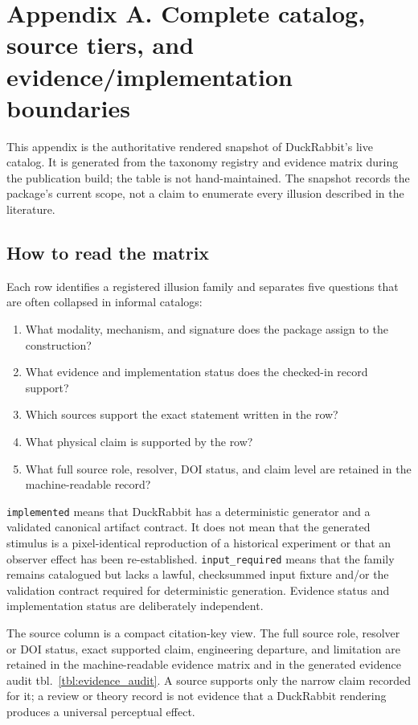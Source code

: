 \documentclass[
  english,
]{article}
\providecommand{\tightlist}{%
  \setlength{\itemsep}{0pt}\setlength{\parskip}{0pt}}
\begin{document}
\newpage

\section{Appendix A. Complete catalog, source tiers, and
evidence/implementation boundaries}\label{sec:appendix_catalog}

This appendix is the authoritative rendered snapshot of DuckRabbit's
live catalog. It is generated from the taxonomy registry and evidence
matrix during the publication build; the table is not hand-maintained.
The snapshot records the package's current scope, not a claim to
enumerate every illusion described in the literature.

\subsection{How to read the matrix}\label{how-to-read-the-matrix}

Each row identifies a registered illusion family and separates five
questions that are often collapsed in informal catalogs:

\begin{enumerate}
\def\labelenumi{\arabic{enumi}.}
\tightlist
\item
  What modality, mechanism, and signature does the package assign to the
  construction?
\item
  What evidence and implementation status does the checked-in record
  support?
\item
  Which sources support the exact statement written in the row?
\item
  What physical claim is supported by the row?
\item
  What full source role, resolver, DOI status, and claim level are
  retained in the machine-readable record?
\end{enumerate}

\texttt{implemented} means that DuckRabbit has a deterministic generator
and a validated canonical artifact contract. It does not mean that the
generated stimulus is a pixel-identical reproduction of a historical
experiment or that an observer effect has been re-established.
\texttt{input\_required} means that the family remains catalogued but
lacks a lawful, checksummed input fixture and/or the validation contract
required for deterministic generation. Evidence status and
implementation status are deliberately independent.

The source column is a compact citation-key view. The full source role,
resolver or DOI status, exact supported claim, engineering departure,
and limitation are retained in the machine-readable evidence matrix and
in the generated evidence audit tbl.~\ref{tbl:evidence_audit}. A source
supports only the narrow claim recorded for it; a review or theory
record is not evidence that a DuckRabbit rendering produces a universal
perceptual effect.
\end{document}
